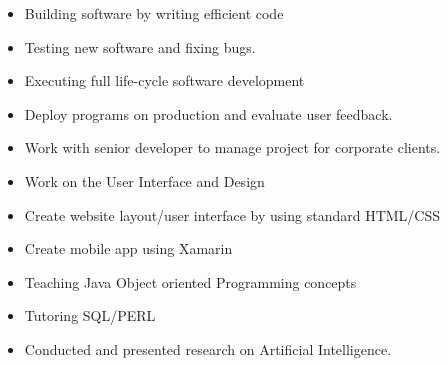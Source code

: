 \documentclass[10pt,a4paper]{altacv}
\begin{document}


\begin{fullwidth}
\makecvheader
\end{fullwidth}





\begin{itemize}
\item Building software by writing efficient code
\item Testing new software and fixing bugs. 
\item Executing full life-cycle software development 
\item Deploy programs on production and evaluate user feedback. 
\item Work with senior developer to manage project for corporate clients. 
\item Work on the User Interface and Design 


\end{itemize}


\divider


\begin{itemize}
\item Create website layout/user interface by using standard HTML/CSS  
\item Create mobile app using Xamarin 
\end{itemize}


\divider


\begin{itemize}
\item Teaching Java Object oriented Programming concepts 
\item Tutoring SQL/PERL
\item Conducted and presented research on Artificial Intelligence.
  

\end{itemize}
\divider
\end{document}

